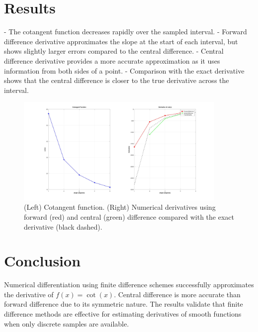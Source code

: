 \section*{Results}
- The cotangent function decreases rapidly over the sampled interval.
- Forward difference derivative approximates the slope at the start of each interval, but shows slightly larger errors compared to the central difference.
- Central difference derivative provides a more accurate approximation as it uses information from both sides of a point.
- Comparison with the exact derivative shows that the central difference is closer to the true derivative across the interval.

\begin{figure}[h!]
  \centering
  \includegraphics[width=0.9\textwidth]{a3.jpg}
  \caption{(Left) Cotangent function. (Right) Numerical derivatives using forward (red) and central (green) difference compared with the exact derivative (black dashed).}
\end{figure}

\section*{Conclusion}
Numerical differentiation using finite difference schemes successfully approximates the derivative of \(f(x) = \cot(x)\). Central difference is more accurate than forward difference due to its symmetric nature. The results validate that finite difference methods are effective for estimating derivatives of smooth functions when only discrete samples are available.
